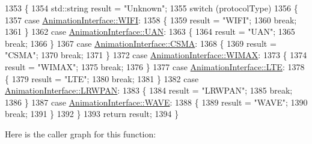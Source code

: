 \begin{DoxyCode}
1353 \{
1354   std::string result = \textcolor{stringliteral}{"Unknown"};
1355   \textcolor{keywordflow}{switch} (protocolType)
1356     \{
1357       \textcolor{keywordflow}{case} \hyperlink{classns3_1_1AnimationInterface_a801a4efd553ff0d1d768cd70d22456b6afc37c88b12f1b26ee565dac2536d0bb5}{AnimationInterface::WIFI}:
1358         \{
1359           result = \textcolor{stringliteral}{"WIFI"};
1360           \textcolor{keywordflow}{break};
1361         \}
1362       \textcolor{keywordflow}{case} \hyperlink{classns3_1_1AnimationInterface_a801a4efd553ff0d1d768cd70d22456b6a930e85d5c281228df80c06e2aa921e2c}{AnimationInterface::UAN}:
1363         \{
1364           result = \textcolor{stringliteral}{"UAN"};
1365           \textcolor{keywordflow}{break};
1366         \}
1367       \textcolor{keywordflow}{case} \hyperlink{classns3_1_1AnimationInterface_a801a4efd553ff0d1d768cd70d22456b6a5fb0f9f61327638f165213b90492cfa7}{AnimationInterface::CSMA}:
1368         \{
1369           result = \textcolor{stringliteral}{"CSMA"};
1370           \textcolor{keywordflow}{break};
1371         \}
1372       \textcolor{keywordflow}{case} \hyperlink{classns3_1_1AnimationInterface_a801a4efd553ff0d1d768cd70d22456b6a1efe3945a884415af2a55f40b35848cd}{AnimationInterface::WIMAX}:
1373         \{
1374           result = \textcolor{stringliteral}{"WIMAX"};
1375           \textcolor{keywordflow}{break};
1376         \}
1377       \textcolor{keywordflow}{case} \hyperlink{classns3_1_1AnimationInterface_a801a4efd553ff0d1d768cd70d22456b6a8a686aad98ab0f637f9e8ff674672d0a}{AnimationInterface::LTE}:
1378         \{
1379           result = \textcolor{stringliteral}{"LTE"};
1380           \textcolor{keywordflow}{break};
1381         \}
1382       \textcolor{keywordflow}{case} \hyperlink{classns3_1_1AnimationInterface_a801a4efd553ff0d1d768cd70d22456b6a6356c745a7c48e2f8789f87a4f90da89}{AnimationInterface::LRWPAN}:
1383         \{
1384           result = \textcolor{stringliteral}{"LRWPAN"};
1385           \textcolor{keywordflow}{break};
1386         \}
1387       \textcolor{keywordflow}{case} \hyperlink{classns3_1_1AnimationInterface_a801a4efd553ff0d1d768cd70d22456b6a090868db2e88c7d4d576d145ef25ab93}{AnimationInterface::WAVE}:
1388         \{
1389           result = \textcolor{stringliteral}{"WAVE"};
1390           \textcolor{keywordflow}{break};
1391         \}
1392     \}
1393   \textcolor{keywordflow}{return} result;
1394 \}
\end{DoxyCode}


Here is the caller graph for this function\+:


